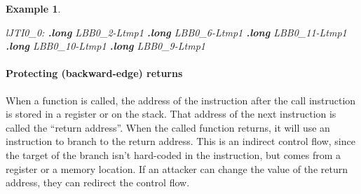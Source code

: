 \documentclass[
  a4paper,
]{report}
\newtheorem{example}{Example}
\newenvironment{Shaded}{}{}
\newcommand{\FunctionTok}[1]{\textcolor[rgb]{0.02,0.16,0.49}{#1}}
\newcommand{\KeywordTok}[1]{\textcolor[rgb]{0.00,0.44,0.13}{\textbf{#1}}}
\newcommand{\NormalTok}[1]{#1}
\newcommand{\OperatorTok}[1]{\textcolor[rgb]{0.40,0.40,0.40}{#1}}
\begin{document}
\begin{example}
\begin{Shaded}
\begin{Highlighting}[]
\FunctionTok{lJTI0\_0:}
  \KeywordTok{.long}\NormalTok{ LBB0\_2}\OperatorTok{{-}}\NormalTok{Ltmp1}
  \KeywordTok{.long}\NormalTok{ LBB0\_6}\OperatorTok{{-}}\NormalTok{Ltmp1}
  \KeywordTok{.long}\NormalTok{ LBB0\_11}\OperatorTok{{-}}\NormalTok{Ltmp1}
  \KeywordTok{.long}\NormalTok{ LBB0\_10}\OperatorTok{{-}}\NormalTok{Ltmp1}
  \KeywordTok{.long}\NormalTok{ LBB0\_9}\OperatorTok{{-}}\NormalTok{Ltmp1}
\end{Highlighting}
\end{Shaded}

\end{example}

\paragraph{Protecting (backward-edge)
returns}\label{protecting-backward-edge-returns}

When a function is called, the address of the instruction after the call
instruction is stored in a register or on the stack. That address of the
next instruction is called the ``return address''.
When the called function returns, it will use an instruction to branch
to the return address. This is an indirect control flow, since the
target of the branch isn't hard-coded in the instruction, but comes from
a register or a memory location. If an attacker can change the value of
the return address, they can redirect the control flow.
\end{document}
